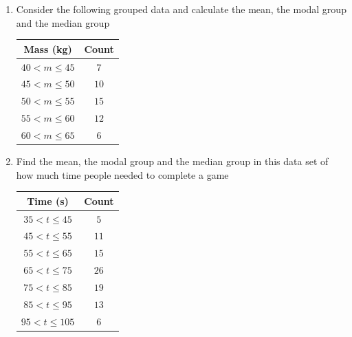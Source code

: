 \begin{exercises}{}{
  \begin{enumerate}[itemsep=8pt, label=\textbf{\arabic*}.]

  \item Consider the following grouped data and calculate the mean,
    the modal group and the median group
\\
    \begin{center}
      \begin{tabular}{|c|c|}\hline
      
        \textbf{Mass (kg)} & \textbf{Count} \\\hline
     
        $40 < m \le 45$ & $7$ \\\hline
        $45 < m \le 50$ & $10$ \\\hline
        $50 < m \le 55$ & $15$ \\\hline
        $55 < m \le 60$ & $12$ \\\hline
        $60 < m \le 65$ & $6$ \\\hline
  
      \end{tabular}
    \end{center}

  \item Find the mean, the modal group and the median group in this
    data set of how much time people needed to complete a game
\\
    \begin{center}
      \begin{tabular}{|c|c|} \hline

       \textbf{Time (s)} & \textbf{Count} \\ \hline

        $35 < t \le 45$ & $5$ \\\hline
        $45 < t \le 55$ & $11$ \\\hline
        $55 < t \le 65$ & $15$ \\\hline
        $65 < t \le 75$ & $26$ \\\hline
        $75 < t \le 85$ & $19$ \\\hline
        $85 < t \le 95$ & $13$ \\\hline
        $95 < t \le 105$ & $6$ \\\hline


\end{tabular}
\end{center}
\end{enumerate}}
\end{exercises}
